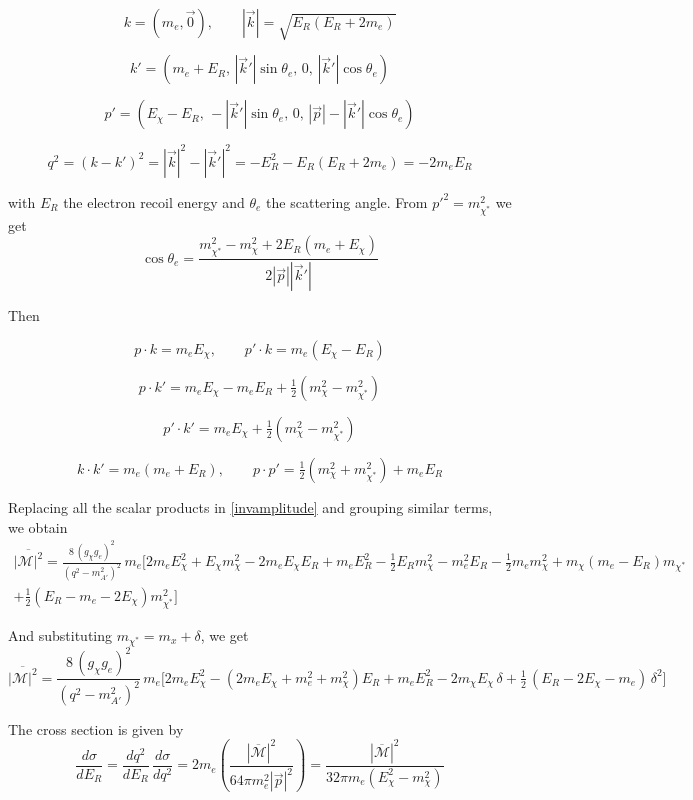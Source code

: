 \documentclass[13.1pt, letterpaper, twoside]{article}
\begin{document}
\[
k = (m_e, \vec{0}),
\qquad |\vec{k}| = \sqrt{E_R(E_R + 2 m_e)}
\]

\[
k' = (m_e + E_R,\, |\vec{k}'|\sin\theta_e,\, 0,\, |\vec{k}'|\cos\theta_e)
\]

\[
p' = (E_\chi - E_R,\,-|\vec{k}'|\sin\theta_e,\, 0,\, |\vec{p}| - |\vec{k}'|\cos\theta_e)
\]

\[
q^2 = (k - k')^2 = |\vec{k}|^2 - |\vec{k}'|^2 
= -E_R^2 - E_R(E_R + 2 m_e) = -2 m_e E_R
\]

with $E_R$ the electron recoil energy and $\theta_e$ the scattering angle.  
From $p'^2 = m_{\chi^\ast}^2$ we get
\[
\cos\theta_e 
= \frac{m_{\chi^\ast}^2 - m_\chi^2 + 2E_R(m_e + E_\chi)}{2|\vec{p}||\vec{k}'|}
\]

Then 

\[
p \cdot k = m_e E_\chi, 
\qquad 
p' \cdot k = m_e(E_\chi - E_R)
\]

\[
p \cdot k' = m_e E_\chi - m_e E_R + \tfrac{1}{2}\left(m_\chi^2 - m_{\chi^\ast}^2\right)
\]

\[
p' \cdot k' = m_e E_\chi + \tfrac{1}{2}\left(m_\chi^2 - m_{\chi^\ast}^2\right)
\]

\[
k \cdot k' = m_e(m_e + E_R),
\qquad
p \cdot p' = \tfrac{1}{2}\left(m_\chi^2 + m_{\chi^\ast}^2\right) + m_e E_R
\]

Replacing all the scalar products in \ref{invamplitude} and grouping similar terms, we obtain
\begin{gather*}
    \overline{|\mathcal{M}|^2} = \frac{8\,(g_\chi g_e)^2}{(q^2 - m_{A'}^2)^2}\, m_e 
    \Bigg[
    2 m_e E_\chi^2 + E_\chi m_\chi^2 
    - 2 m_e E_\chi E_R + m_e E_R^2
    - \tfrac{1}{2} E_R m_\chi^2 - m_e^2 E_R 
    - \tfrac{1}{2} m_e m_\chi^2  
    + m_\chi (m_e - E_R)m_{\chi^\ast} \\
    + \tfrac{1}{2}(E_R - m_e - 2E_\chi)m_{\chi^\ast}^2
    \Bigg]    
\end{gather*}

And substituting $m_{\chi^\ast} = m_x + \delta$, we get
\[
\overline{|\mathcal{M}|^2} = \frac{8\,(g_\chi g_e)^2}{(q^2 - m_{A'}^2)^2}\, m_e
\Bigg[
  2 m_e E_\chi^2
  - (2 m_e E_\chi + m_e^2 + m_\chi^2) E_R
  + m_e E_R^2
  - 2 m_\chi E_\chi \,\delta
  + \tfrac{1}{2}\,(E_R - 2E_\chi - m_e)\,\delta^2
\Bigg]
\]

The cross section is given by
\[
\frac{d\sigma}{dE_R} 
= \frac{dq^2}{dE_R}\,\frac{d\sigma}{dq^2}
= 2 m_e \left( \frac{|\overline{\mathcal{M}}|^2}{64\pi m_e^2 |\vec{p}|^2} \right)
= \frac{|\overline{\mathcal{M}}|^2}{32\pi m_e (E_\chi^2 - m_\chi^2)} 
\]
\end{document}
